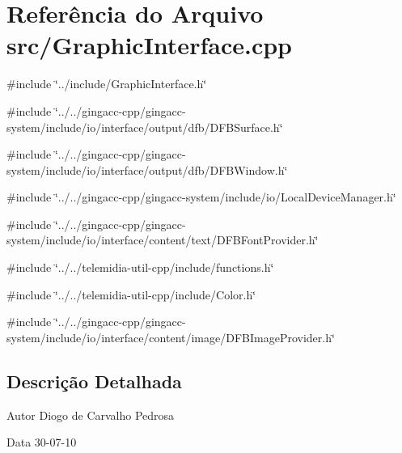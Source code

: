 \section{Referência do Arquivo src/GraphicInterface.cpp}
\label{GraphicInterface_8cpp}
{\ttfamily \#include \char`\"{}../include/GraphicInterface.h\char`\"{}}\par
{\ttfamily \#include \char`\"{}../../gingacc-\/cpp/gingacc-\/system/include/io/interface/output/dfb/DFBSurface.h\char`\"{}}\par
{\ttfamily \#include \char`\"{}../../gingacc-\/cpp/gingacc-\/system/include/io/interface/output/dfb/DFBWindow.h\char`\"{}}\par
{\ttfamily \#include \char`\"{}../../gingacc-\/cpp/gingacc-\/system/include/io/LocalDeviceManager.h\char`\"{}}\par
{\ttfamily \#include \char`\"{}../../gingacc-\/cpp/gingacc-\/system/include/io/interface/content/text/DFBFontProvider.h\char`\"{}}\par
{\ttfamily \#include \char`\"{}../../telemidia-\/util-\/cpp/include/functions.h\char`\"{}}\par
{\ttfamily \#include \char`\"{}../../telemidia-\/util-\/cpp/include/Color.h\char`\"{}}\par
{\ttfamily \#include \char`\"{}../../gingacc-\/cpp/gingacc-\/system/include/io/interface/content/image/DFBImageProvider.h\char`\"{}}\par


\subsection{Descrição Detalhada}
\begin{DoxyAuthor}{Autor}
Diogo de Carvalho Pedrosa 
\end{DoxyAuthor}
\begin{DoxyDate}{Data}
30-\/07-\/10 
\end{DoxyDate}
